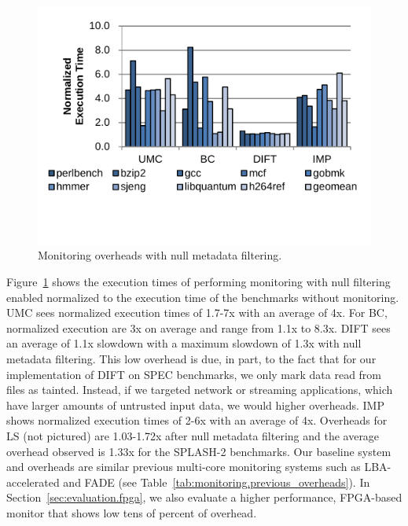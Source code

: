 \begin{figure}
  \begin{center}
    \includegraphics[width=\columnwidth, clip=true, trim=0 0.5in 0 0.1in]{figs/data_filtering.pdf}
    \vspace{-0.2in}
    \caption{Monitoring overheads with null metadata filtering.}
    \label{fig:evaluation.filtering}
    \vspace{-0.1in}
  \end{center}
\end{figure}

Figure~\ref{fig:evaluation.filtering} shows the
execution times of performing monitoring with null filtering enabled normalized
to the execution time of the benchmarks without monitoring. UMC sees normalized
execution times of 1.7-7x with an average of 4x.
For BC, normalized execution
are 3x on average and range from 1.1x to 8.3x.
DIFT sees an average of 1.1x slowdown with a maximum slowdown of 1.3x with null
metadata filtering. This low overhead is due, in part, to the fact
that for our implementation of DIFT on SPEC
benchmarks, we only mark data read from files as tainted. Instead, if we
targeted network or streaming applications, which have larger amounts of
untrusted input data, we would higher overheads. IMP shows normalized
execution times of 2-6x with an average of 4x. Overheads for LS (not pictured) are
1.03-1.72x after null metadata filtering and the average
overhead observed is 1.33x for the SPLASH-2 benchmarks.
Our baseline system and overheads are similar previous multi-core
monitoring systems such as LBA-accelerated \cite{lba-isca08} and FADE
\cite{fade-hpca14} (see
Table~\ref{tab:monitoring.previous_overheads}). In
Section~\ref{sec:evaluation.fpga}, we also evaluate a higher performance, FPGA-based
monitor that shows low tens of percent of overhead. 

